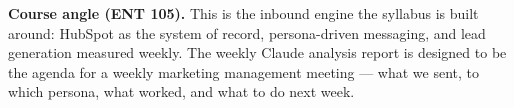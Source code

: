 \documentclass[11pt]{article}
\begin{document}
\begin{courseangle}
\textbf{Course angle (ENT 105).} This is the inbound engine the syllabus is built around:
HubSpot as the system of record, persona-driven messaging, and lead generation measured weekly.
The weekly Claude analysis report is designed to be the agenda for a weekly marketing management
meeting --- what we sent, to which persona, what worked, and what to do next week.
\end{courseangle}
\end{document}

